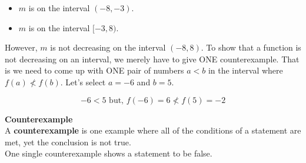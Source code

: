 \documentclass{ximera}
\begin{document}
\begin{example}
\begin{itemize}
\item $m$ is  on the interval $(-8,-3)$.  
\item $m$ is  on the interval $[-3, 8)$. 
\end{itemize}



However, $m$ is not decreasing on the interval $(-8, 8)$.  To show that a function is not decreasing on an interval, we merely have to give ONE counterexample. That is we need to come up with ONE pair of numbers $a < b$ in the interval where $f(a) \nless f(b)$.  Let's select $a = -6$ and $b = 5$.

\[ -6 < 5    \text{ but, }   f(-6) = 6  \nless f(5) = -2 \]




\end{example}












\begin{definition} \textbf{\textcolor{green!50!black}{Counterexample}} \\

A \textbf{counterexample} is one example where all of the conditions of a statement are met, yet the conclusion is not true.  \\

One single counterexample shows a statement to be false.


\end{definition}
\end{document}
